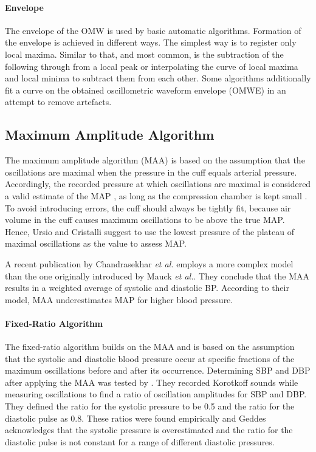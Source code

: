 \paragraph{Envelope} The envelope of the OMW is used by basic automatic algorithms. Formation of the envelope is achieved in different ways. The simplest way is to register only local maxima. Similar to that, and most common, is the subtraction of the following through from a local peak or interpolating the curve of local maxima and local minima to subtract them from each other. Some algorithms additionally fit a curve on the obtained oscillometric waveform envelope (OMWE) in an attempt to remove artefacts. \cite{Forouzanfar2014}


\subsection{Maximum Amplitude Algorithm}
The maximum amplitude algorithm (MAA) is based on the assumption that the oscillations are maximal when the pressure in the cuff equals arterial pressure. Accordingly, the recorded pressure at which oscillations are maximal is considered a valid estimate of the MAP \citep{Babbs2012,Geddes1982,Drzewiecki1994,Ramsey1979}, as long as the compression chamber is kept small \cite{Mauck1980}. To avoid introducing errors, the cuff should always be tightly fit, because air volume in the cuff causes maximum oscillations to be above the true MAP. Hence, Ursio and Cristalli suggest to use the lowest pressure of the plateau of maximal oscillations as the value to assess MAP.\cite{Ursino1996}

A recent publication by Chandrasekhar \textit{et al.} \cite{Chandrasekhar2019} employs a more complex model than the one originally introduced by Mauck \textit{et al.}\cite{Mauck1980}. They conclude that the MAA results in a weighted average of systolic and diastolic BP. According to their model, MAA underestimates MAP for higher blood pressure.

\paragraph{Fixed-Ratio Algorithm} The fixed-ratio algorithm builds on the MAA and is based on the assumption that the systolic and diastolic blood pressure occur at specific fractions of the maximum oscillations before and after its occurrence. Determining SBP and DBP after applying the MAA was tested by \citet{Geddes1982}. They recorded Korotkoff sounds while measuring oscillations to find a ratio of oscillation amplitudes for SBP and DBP. They defined the ratio for the systolic pressure to be 0.5 and the ratio for the diastolic pulse as 0.8. These ratios were found empirically and Geddes acknowledges that the systolic pressure is overestimated and the ratio for the diastolic pulse is not constant for a range of different diastolic pressures.

